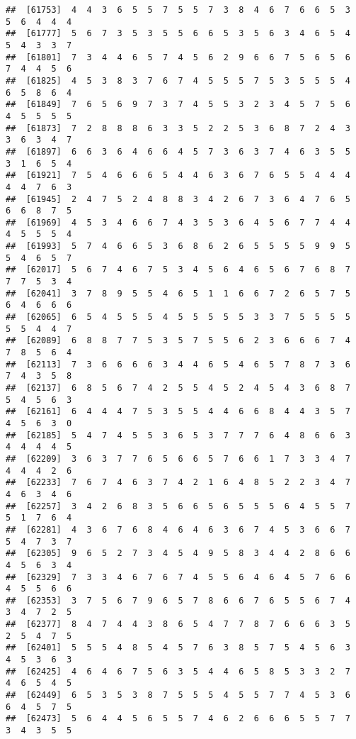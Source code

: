 \documentclass[
]{book}
\begin{document}
\begin{verbatim}
##  [61753]  4  4  3  6  5  5  7  5  5  7  3  8  4  6  7  6  6  5  3  5  6  4  4  4
##  [61777]  5  6  7  3  5  3  5  5  6  6  5  3  5  6  3  4  6  5  4  5  4  3  3  7
##  [61801]  7  3  4  4  6  5  7  4  5  6  2  9  6  6  7  5  6  5  6  7  4  4  5  6
##  [61825]  4  5  3  8  3  7  6  7  4  5  5  5  7  5  3  5  5  5  4  6  5  8  6  4
##  [61849]  7  6  5  6  9  7  3  7  4  5  5  3  2  3  4  5  7  5  6  4  5  5  5  5
##  [61873]  7  2  8  8  8  6  3  3  5  2  2  5  3  6  8  7  2  4  3  3  6  3  4  7
##  [61897]  6  6  3  6  4  6  6  4  5  7  3  6  3  7  4  6  3  5  5  3  1  6  5  4
##  [61921]  7  5  4  6  6  6  5  4  4  6  3  6  7  6  5  5  4  4  4  4  4  7  6  3
##  [61945]  2  4  7  5  2  4  8  8  3  4  2  6  7  3  6  4  7  6  5  6  6  8  7  5
##  [61969]  4  5  3  4  6  6  7  4  3  5  3  6  4  5  6  7  7  4  4  4  5  5  5  4
##  [61993]  5  7  4  6  6  5  3  6  8  6  2  6  5  5  5  5  9  9  5  5  4  6  5  7
##  [62017]  5  6  7  4  6  7  5  3  4  5  6  4  6  5  6  7  6  8  7  7  7  5  3  4
##  [62041]  3  7  8  9  5  5  4  6  5  1  1  6  6  7  2  6  5  7  5  6  4  6  6  6
##  [62065]  6  5  4  5  5  5  4  5  5  5  5  5  3  3  7  5  5  5  5  5  5  4  4  7
##  [62089]  6  8  8  7  7  5  3  5  7  5  5  6  2  3  6  6  6  7  4  7  8  5  6  4
##  [62113]  7  3  6  6  6  6  3  4  4  6  5  4  6  5  7  8  7  3  6  7  4  3  5  8
##  [62137]  6  8  5  6  7  4  2  5  5  4  5  2  4  5  4  3  6  8  7  5  4  5  6  3
##  [62161]  6  4  4  4  7  5  3  5  5  4  4  6  6  8  4  4  3  5  7  4  5  6  3  0
##  [62185]  5  4  7  4  5  5  3  6  5  3  7  7  7  6  4  8  6  6  3  4  4  4  4  5
##  [62209]  3  6  3  7  7  6  5  6  6  5  7  6  6  1  7  3  3  4  7  4  4  4  2  6
##  [62233]  7  6  7  4  6  3  7  4  2  1  6  4  8  5  2  2  3  4  7  4  6  3  4  6
##  [62257]  3  4  2  6  8  3  5  6  6  5  6  5  5  5  6  4  5  5  7  5  1  7  6  4
##  [62281]  4  3  6  7  6  8  4  6  4  6  3  6  7  4  5  3  6  6  7  5  4  7  3  7
##  [62305]  9  6  5  2  7  3  4  5  4  9  5  8  3  4  4  2  8  6  6  4  5  6  3  4
##  [62329]  7  3  3  4  6  7  6  7  4  5  5  6  4  6  4  5  7  6  6  4  5  5  6  6
##  [62353]  3  7  5  6  7  9  6  5  7  8  6  6  7  6  5  5  6  7  4  3  4  7  2  5
##  [62377]  8  4  7  4  4  3  8  6  5  4  7  7  8  7  6  6  6  3  5  2  5  4  7  5
##  [62401]  5  5  5  4  8  5  4  5  7  6  3  8  5  7  5  4  5  6  3  4  5  3  6  3
##  [62425]  4  6  4  6  7  5  6  3  5  4  4  6  5  8  5  3  3  2  7  4  6  5  4  5
##  [62449]  6  5  3  5  3  8  7  5  5  5  4  5  5  7  7  4  5  3  6  6  4  5  7  5
##  [62473]  5  6  4  4  5  6  5  5  7  4  6  2  6  6  6  5  5  7  7  3  4  3  5  5

\end{verbatim}
\end{document}
